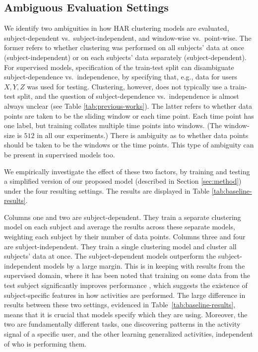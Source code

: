 \documentclass[wcp]{jmlr}
\begin{document}
\subsection{Ambiguous Evaluation Settings} \label{subsec:ambiguous-eval}
We identify two ambiguities in how HAR clustering models are evaluated, subject-dependent vs.\ subject-independent, and window-wise vs.\ point-wise. The former refers to whether clustering was performed on all subjects' data at once (subject-independent) or on each subjects' data separately (subject-dependent). For supervised models, specification of the train-test split can disambiguate subject-dependence vs.\ independence, by specifying that, e.g., data for users $X,Y,Z$ was used for testing. Clustering, however, does not typically use a train-test split, and the question of subject-dependence vs.\ independence is almost always unclear (see Table \ref{tab:previous-works}). The latter refers to whether data points are taken to be the sliding window or each time point. Each time point has one label, but training collates multiple time points into windows. (The window-size is $512$ in all our experiments.) There is ambiguity as to whether data points should be taken to be the windows or the time points. This type of ambiguity can be present in supervised models too.


We empirically investigate the effect of these two factors, by training and testing a simplified version of our proposed model (described in Section \ref{sec:method}) under the four resulting settings.  The results are displayed in Table \ref{tab:baseline-results}. 


Columns one and two are subject-dependent. They train a separate clustering model on each subject and average the results across these separate models, weighting each subject by their number of data points. Columns three and four are subject-independent. They train a single clustering model and cluster all subjects' data at once. The subject-dependent models outperform the subject-independent models by a large margin. This is in keeping with results from the supervised domain, where it has been noted that training on some data from the test subject significantly improves performance \citep{reiss2012introducing,suh2021adversarial}, which suggests the existence of subject-specific features in how activities are performed.  The large difference in results between these two settings, evidenced in \mbox{Table \ref{tab:baseline-results}}, means that it is crucial that models specify which they are using. Moreover, the two are fundamentally different tasks, one discovering patterns in the activity signal of a specific user, and the other learning generalized activities, independent of who is performing them. 
\end{document}
